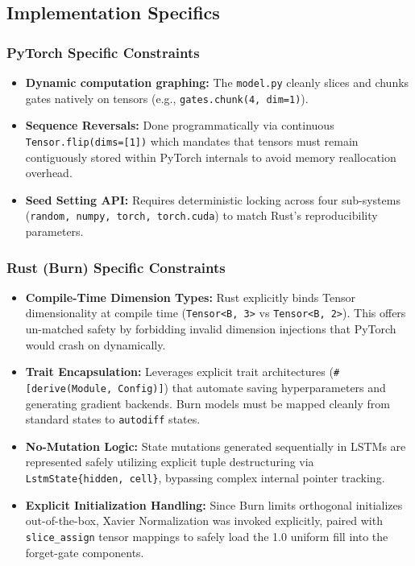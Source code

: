 \documentclass{ieeeaccess}
\begin{document}
\subsection{Implementation Specifics}
\subsubsection{PyTorch Specific Constraints}
\begin{itemize}
    \item \textbf{Dynamic computation graphing:} The \texttt{model.py} cleanly slices and chunks gates natively on tensors (e.g., \texttt{gates.chunk(4, dim=1)}).
    \item \textbf{Sequence Reversals:} Done programmatically via continuous \texttt{Tensor.flip(dims=[1])} which mandates that tensors must remain contiguously stored within PyTorch internals to avoid memory reallocation overhead.
    \item \textbf{Seed Setting API:} Requires deterministic locking across four sub-systems (\texttt{random, numpy, torch, torch.cuda}) to match Rust's reproducibility parameters.
\end{itemize}

\subsubsection{Rust (Burn) Specific Constraints}
\begin{itemize}
    \item \textbf{Compile-Time Dimension Types:} Rust explicitly binds Tensor dimensionality at compile time (\texttt{Tensor<B, 3>} vs \texttt{Tensor<B, 2>}). This offers un-matched safety by forbidding invalid dimension injections that PyTorch would crash on dynamically.
    \item \textbf{Trait Encapsulation:} Leverages explicit trait architectures (\texttt{\#[derive(Module, Config)]}) that automate saving hyperparameters and generating gradient backends. Burn models must be mapped cleanly from standard states to \texttt{autodiff} states.
    \item \textbf{No-Mutation Logic:} State mutations generated sequentially in LSTMs are represented safely utilizing explicit tuple destructuring via \texttt{LstmState\{hidden, cell\}}, bypassing complex internal pointer tracking.
    \item \textbf{Explicit Initialization Handling:} Since Burn limits orthogonal initializes out-of-the-box, Xavier Normalization was invoked explicitly, paired with \texttt{slice\_assign} tensor mappings to safely load the 1.0 uniform fill into the forget-gate components. 
\end{itemize}
\end{document}

